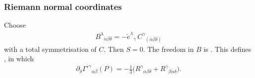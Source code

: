 \documentclass[letterpaper,10pt,english]{jupyterBook}
\begin{document}
\subsubsection{Riemann normal coordinates}
\label{\detokenize{ch/relativity-general/local-inertial-reference-frame-and-equivalence-principle:riemann-normal-coordinates}}
\sphinxAtStartPar
Choose
\begin{equation*}
\begin{split}
B^\lambda{}_{\alpha\beta\delta}=-\tilde e^\lambda{}_\gamma\,C^\gamma{}_{(\alpha\beta\delta)}
\end{split}
\end{equation*}
\sphinxAtStartPar
with a total symmetrisation of \(C\). Then \(S=0\). The freedom in \(B\) is . This defines , in which
\begin{equation*}
\begin{split}
\partial_\delta\Gamma'^\gamma{}_{\alpha\beta}(P)=-\tfrac13\big(R^\gamma{}_{\alpha\beta\delta}+R^\gamma{}_{\beta\alpha\delta}\big).
\end{split}
\end{equation*}
\end{document}

